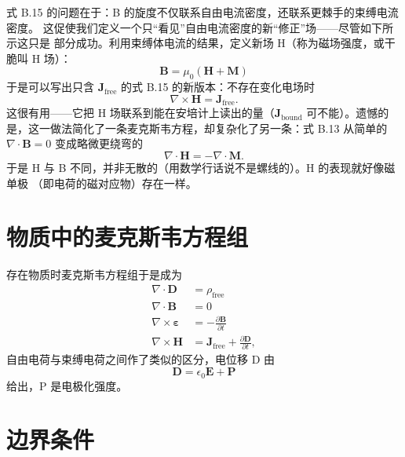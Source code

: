 式 B.15 的问题在于：B 的旋度不仅联系自由电流密度，还联系更棘手的束缚电流密度。
这促使我们定义一个只“看见”自由电流密度的新“修正”场——尽管如下所示这只是
部分成功。利用束缚体电流的结果，定义新场 H（称为磁场强度，或干脆叫 H 场）：
\begin{equation*}
\mathbf{B} = \mu_0(\mathbf{H}+\mathbf{M})\tag{B.23}
\end{equation*}
于是可以写出只含 $\mathbf{J}_{\text{free}}$ 的式 B.15 的新版本：不存在变化电场时
\begin{equation*}
\nabla\times\mathbf{H} = \mathbf{J}_{\text{free}}.\tag{B.24}
\end{equation*}
这很有用——它把 H 场联系到能在安培计上读出的量（$\mathbf{J}_{\text{bound}}$
可不能）。遗憾的是，这一做法简化了一条麦克斯韦方程，却复杂化了另一条：式 B.13
从简单的 $\nabla\cdot\mathbf{B}=0$ 变成略微更绕弯的
\begin{equation*}
\nabla\cdot\mathbf{H} = -\nabla\cdot\mathbf{M}.\tag{B.25}
\end{equation*}
于是 H 与 B 不同，并非无散的（用数学行话说不是螺线的）。H 的表现就好像磁单极
（即电荷的磁对应物）存在一样。

\section{物质中的麦克斯韦方程组}

存在物质时麦克斯韦方程组于是成为
\begin{align*}
\nabla\cdot\mathbf{D} &= \rho_{\mathrm{free}}\tag{B.26}\\
\nabla\cdot\mathbf{B} &= 0\tag{B.27}\\
\nabla\times\boldsymbol{\varepsilon} &= -\frac{\partial\mathbf{B}}{\partial t}\tag{B.28}\\
\nabla\times\mathbf{H} &= \mathbf{J}_{\text{free}} + \frac{\partial\mathbf{D}}{\partial t},\tag{B.29}
\end{align*}
自由电荷与束缚电荷之间作了类似的区分，电位移 D 由
\begin{equation*}
\mathbf{D} = \epsilon_0\mathbf{E} + \mathbf{P}\tag{B.30}
\end{equation*}
给出，P 是电极化强度。

\section{边界条件}

